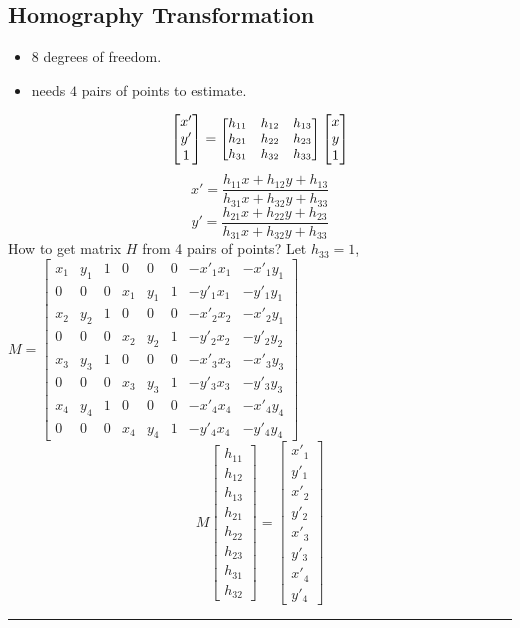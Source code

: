 \subsection{Homography Transformation}
\begin{itemize}
  \item $8$ degrees of freedom.
  \item needs $4$ pairs of points to estimate.
\end{itemize}
\[\begin{bmatrix}
  x'\\
  y'\\
  1
\end{bmatrix}=
{\small
\begin{bmatrix}
  h_{11} & h_{12} & h_{13}\\
  h_{21} & h_{22} & h_{23}\\
  h_{31} & h_{32} & h_{33}
\end{bmatrix}
}
\begin{bmatrix}
  x\\
  y\\
  1
\end{bmatrix}
\]
\[
x' = \frac{h_{11}x + h_{12}y + h_{13}}{h_{31}x + h_{32}y + h_{33}}
\]
\[
y' = \frac{h_{21}x + h_{22}y + h_{23}}{h_{31}x + h_{32}y + h_{33}}
\]
How to get matrix $H$ from 4 pairs of points?
Let $h_{33}=1$,
$ M =
\begin{bmatrix}
  x_1 & y_1 & 1 & 0 & 0 & 0 & {-x'_1x_1} & {-x'_1 y_1}\\
  0 & 0 & 0 & x_1 & y_1 & 1 & {-y'_1x_1} & {-y'_1 y_1}\\
  x_2 & y_2 & 1 & 0 & 0 & 0 & {-x'_2x_2} & {-x'_2 y_1}\\
  0 & 0 & 0 & x_2 & y_2 & 1 & {-y'_2x_2} & {-y'_2 y_2}\\
  x_3 & y_3 & 1 & 0 & 0 & 0 & {-x'_3x_3} & {-x'_3 y_3}\\
  0 & 0 & 0 & x_3 & y_3 & 1 & {-y'_3x_3} & {-y'_3 y_3}\\
  x_4 & y_4 & 1 & 0 & 0 & 0 & {-x'_4x_4} & {-x'_4 y_4}\\
  0 & 0 & 0 & x_4 & y_4 & 1 & {-y'_4x_4} & {-y'_4 y_4}
\end{bmatrix}
$
\[ M
\begin{bmatrix}
  h_{11}\\
  h_{12}\\
  h_{13}\\
  h_{21}\\
  h_{22}\\
  h_{23}\\
  h_{31}\\
  h_{32}
\end{bmatrix}
=
\begin{bmatrix}
  x'_1\\
  y'_1\\
  x'_2\\
  y'_2\\
  x'_3\\
  y'_3\\
  x'_4\\
  y'_4
\end{bmatrix}
\]

\hrule
